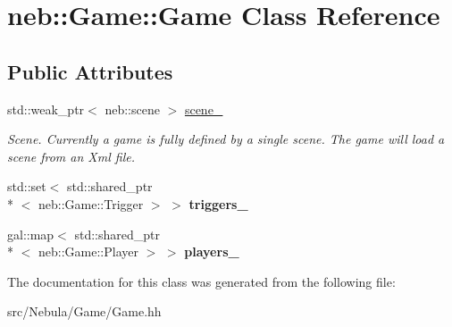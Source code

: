 \hypertarget{classneb_1_1Game_1_1Game}{\section{neb\-:\-:Game\-:\-:Game Class Reference}
\label{classneb_1_1Game_1_1Game}
}
\subsection*{Public Attributes}
\begin{DoxyCompactItemize}
\item 
\hypertarget{classneb_1_1Game_1_1Game_a4f7b6920d5e227713f4fbdac1463cc4a}{std\-::weak\-\_\-ptr$<$ neb\-::scene $>$ \hyperlink{classneb_1_1Game_1_1Game_a4f7b6920d5e227713f4fbdac1463cc4a}{scene\-\_\-}}\label{classneb_1_1Game_1_1Game_a4f7b6920d5e227713f4fbdac1463cc4a}

\begin{DoxyCompactList}\small\item\em Scene. Currently a game is fully defined by a single scene. The game will load a scene from an Xml file. \end{DoxyCompactList}\item 
\hypertarget{classneb_1_1Game_1_1Game_aed3384ec204c8b37ac2a2d28f76bc1cd}{std\-::set$<$ std\-::shared\-\_\-ptr\\*
$<$ neb\-::\-Game\-::\-Trigger $>$ $>$ {\bfseries triggers\-\_\-}}\label{classneb_1_1Game_1_1Game_aed3384ec204c8b37ac2a2d28f76bc1cd}

\item 
\hypertarget{classneb_1_1Game_1_1Game_a2612d65f68620e6576906ac64609ad5d}{gal\-::map$<$ std\-::shared\-\_\-ptr\\*
$<$ neb\-::\-Game\-::\-Player $>$ $>$ {\bfseries players\-\_\-}}\label{classneb_1_1Game_1_1Game_a2612d65f68620e6576906ac64609ad5d}

\end{DoxyCompactItemize}


The documentation for this class was generated from the following file\-:\begin{DoxyCompactItemize}
\item 
src/\-Nebula/\-Game/Game.\-hh\end{DoxyCompactItemize}

